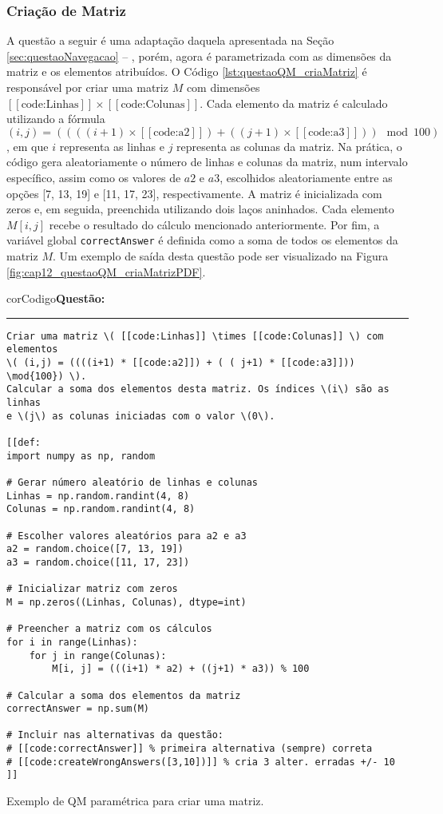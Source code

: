 \subsubsection{Criação de Matriz}

A questão a seguir é uma adaptação daquela apresentada na Seção \ref{sec:questaoNavegacao} -- , porém, agora é parametrizada com as dimensões da matriz e os elementos atribuídos. O Código \ref{lst:questaoQM_criaMatriz} é responsável por criar uma matriz  \(M\) com dimensões \( [[\text{code:Linhas}]] \times [[\text{code:Colunas}]] \). Cada elemento da matriz é calculado utilizando a fórmula \( (i,j) = ((((i+1) \times [[\text{code:a2}]]) + ((j+1) \times [[\text{code:a3}]])) \mod{100}) \), em que \(i\) representa as linhas e \(j\) representa as colunas da matriz.
%
Na prática, o código gera aleatoriamente o número de linhas e colunas da matriz, num intervalo específico, assim como os valores de \(a2\) e \(a3\), escolhidos aleatoriamente entre as opções [7, 13, 19] e [11, 17, 23], respectivamente.
%
A matriz é inicializada com zeros e, em seguida, preenchida utilizando dois laços aninhados. Cada elemento \(M[i,j]\) recebe o resultado do cálculo mencionado anteriormente.
%
Por fim, a variável global \verb|correctAnswer| é definida como a soma de todos os elementos da matriz \(M\). Um exemplo de saída desta questão pode ser visualizado na Figura \ref{fig:cap12_questaoQM_criaMatrizPDF}.


\begin{listing}[!ht]
\begin{myboxCode}{corCodigo}{\textbf{Questão: } }\vspace{3mm}
\hrule
\begin{verbatim}
Criar uma matriz \( [[code:Linhas]] \times [[code:Colunas]] \) com elementos 
\( (i,j) = ((((i+1) * [[code:a2]]) + ( ( j+1) * [[code:a3]])) \mod{100}) \). 
Calcular a soma dos elementos desta matriz. Os índices \(i\) são as linhas
e \(j\) as colunas iniciadas com o valor \(0\).

[[def:
import numpy as np, random

# Gerar número aleatório de linhas e colunas
Linhas = np.random.randint(4, 8)
Colunas = np.random.randint(4, 8)

# Escolher valores aleatórios para a2 e a3
a2 = random.choice([7, 13, 19])
a3 = random.choice([11, 17, 23])

# Inicializar matriz com zeros
M = np.zeros((Linhas, Colunas), dtype=int)

# Preencher a matriz com os cálculos
for i in range(Linhas):
    for j in range(Colunas):
        M[i, j] = (((i+1) * a2) + ((j+1) * a3)) % 100

# Calcular a soma dos elementos da matriz
correctAnswer = np.sum(M)

# Incluir nas alternativas da questão: 
# [[code:correctAnswer]] % primeira alternativa (sempre) correta
# [[code:createWrongAnswers([3,10])]] % cria 3 alter. erradas +/- 10
]]
\end{verbatim}
\end{myboxCode}
\caption{Exemplo de QM paramétrica para criar uma matriz.}
\label{lst:questaoQM_criaMatriz}
\end{listing}

